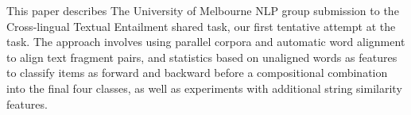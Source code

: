 This paper describes The University of Melbourne NLP group submission   to the Cross-lingual Textual Entailment shared task, our first
   tentative attempt at the task. The approach involves using parallel
   corpora and automatic word alignment to align text fragment pairs, and
   statistics based on unaligned words as features to classify items as
   forward and backward before a compositional combination into the final
   four classes, as well as experiments with additional string similarity
   features.

